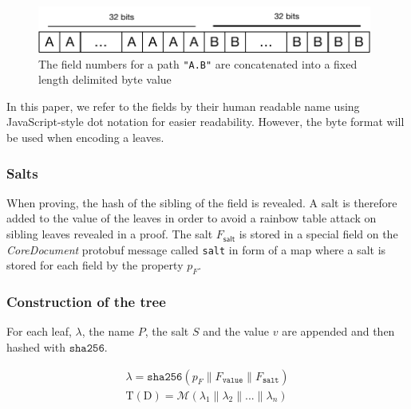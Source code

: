 \begin{figure}[ht]
  \centering
  \includegraphics[width=11cm]{img/property_bits.pdf}
  \caption{The field numbers for a path \texttt{"A.B"} are concatenated into a fixed length delimited byte value} 
  \label{img:property_bits}
\end{figure}

In this paper, we refer to the fields by their human readable name using JavaScript-style dot notation for easier readability. However, the byte format will be used when encoding a leaves.


\subsubsection{Salts}
When proving, the hash of the sibling of the field is revealed. A salt is therefore added to the value of the leaves in order to avoid a rainbow table attack on sibling leaves revealed in a proof. The salt $F_{\mathsf{salt}}$ is stored in a special field on the \textit{CoreDocument} protobuf message called \texttt{salt} in form of a map where a salt is stored for each field by the property $p_F$.

\subsubsection{Construction of the tree}
For each leaf, $\lambda$, the name $P$, the salt $S$ and the value $v$ are appended and then hashed with $\mathtt{sha256}$.

\begin{eqnarray}
\lambda = \mathtt{sha256}(p_{F} \parallel F_{\texttt{value}} \parallel	 F_{\texttt{salt}})\\
\mathrm{T}(\mathrm{D}) = \mathcal{M}({\lambda_{1} \parallel \lambda_{2} \parallel ... \parallel \lambda_{n}})
\end{eqnarray}

